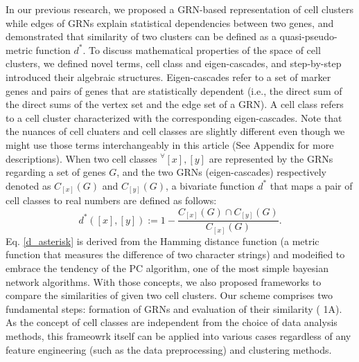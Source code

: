\documentclass{article}
\begin{document}
In our previous research, we proposed a \ac{GRN}-based representation of cell clusters 
while edges of GRNs explain statistical dependencies between two genes, and demonstrated that similarity of two 
clusters can be defined as a quasi-pseudo-metric function $d^*$\cite{okano2023set}. To discuss mathematical properties of the space of 
cell clusters, we defined novel terms, cell class and eigen-cascades, and step-by-step introduced their algebraic 
structures. Eigen-cascades refer to a set of marker genes and pairs of genes that are statistically dependent (i.e., 
the direct sum of the direct sums of the vertex set and the edge set of a GRN). A cell class refers to a cell cluster 
characterized with the corresponding eigen-cascades. Note that the nuances of cell cluaters and cell classes are 
slightly different even though we might use those terms interchangeably in this article (See Appendix for more 
descriptions). When two cell classes $^\forall[x], [y]$ are represented by the GRNs regarding a set of genes $G$, and the two 
GRNs (eigen-cascades) respectively denoted as $C_{[x]}(G)$ and $C_{[y]}(G)$, a bivariate function $d^*$ that maps a pair of cell 
classes to real numbers are defined as follows\cite{okano2023set}:
\begin{equation}\label{d_asterisk}
  d^*([x], [y]) := 1 - \frac{C_{[x]}(G)\cap C_{[y]}(G)}{C_{[x]}(G)}.
\end{equation}
Eq. \eqref{d_asterisk} is derived from the Hamming distance function (a metric function that measures the difference of two 
character strings) and modeified to embrace the tendency of the \ac{PC} algorithm, one of the most 
simple bayesian network algorithms\cite{okano2023set,bookstein2002generalized, spirtes2000causation}. With those concepts, we also proposed frameworks to compare the 
similarities of given two cell clusters. Our scheme comprises two fundamental steps: formation of GRNs and 
evaluation of their similarity (\figurename{ 1A}). As the concept of cell classes are independent from the choice of data 
analysis methods, this frameowrk itself can be applied into various cases regardless of any feature engineering (such 
as the data preprocessing) and clustering methods.
\end{document}
